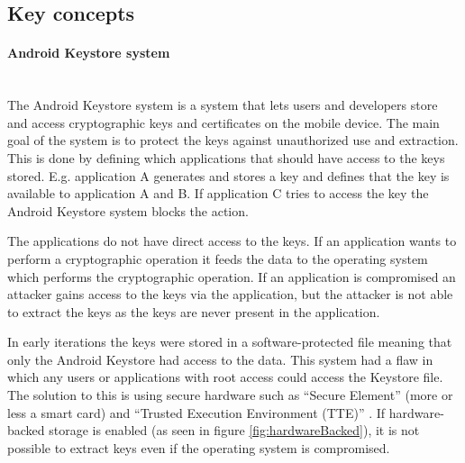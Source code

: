 \subsection{Key concepts}

\paragraph{Android Keystore system}\mbox{}\\
The Android Keystore system is a system that lets users and developers store and access cryptographic keys and certificates on the mobile device. The main goal of the system is to protect the keys against unauthorized use and extraction. This is done by defining which applications that should have access to the keys stored. E.g. application A generates and stores a key and defines that the key is available to application A and B. If application C tries to access the key the Android Keystore system blocks the action.

The applications do not have direct access to the keys. If an application wants to perform a cryptographic operation it feeds the data to the operating system which performs the cryptographic operation. If an application is compromised an attacker gains access to the keys via the application, but the attacker is not able to extract the keys as the keys are never present in the application.

In early iterations the keys were stored in a software-protected file meaning that only the Android Keystore had access to the data. This system had a flaw in which any users or applications with root access could access the Keystore file. The solution to this is using secure hardware such as ``Secure Element'' (more or less a smart card) and ``Trusted Execution Environment (TTE)'' \cite{TEE}. If hardware-backed storage is enabled (as seen in figure \ref{fig:hardwareBacked}), it is not possible to extract keys even if the operating system is compromised.

